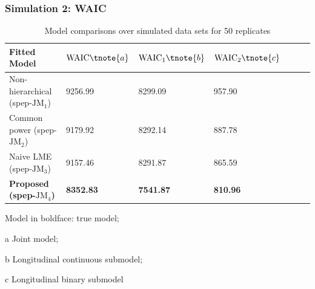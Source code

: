 \documentclass[fleqn]{beamer}
\begin{document}
\begin{frame}
\frametitle{Simulation 2: WAIC}

\begin{table}[ht]
\caption{\footnotesize Model comparisons over simulated data sets for 50 replicates} \label{tab:chp2_sim}
\footnotesize
 \begin{threeparttable}
\begin{tabular}{lllllll}
    \toprule
  Fitted Model &
 $\mbox{WAIC} \tnote{a}$ & $\mbox{WAIC}_1 \tnote{b}$ & $\mbox{WAIC}_2 \tnote{c}$ \\
 \midrule 
   Non-hierarchical (spep-$\mbox{JM}_1$) & 
                9256.99 & 8299.09 & 957.90 \\
  
   Common power (spep-$\mbox{JM}_2$) &
                9179.92 &  8292.14 &  887.78 \\
  
   Naive LME (spep-$\mbox{JM}_3$) &
                 9157.46 & 8291.87 &  865.59 \\
   
   \textbf{Proposed (spep-$\mbox{JM}_4$)} & \textbf{8352.83} & \textbf{7541.87} & \textbf{810.96} \\
    \bottomrule
  \end{tabular}
  \begin{tablenotes}[para]
  \tiny
  Model in boldface: true model; \item[a] Joint model; \item[b] Longitudinal continuous submodel; \item[c] Longitudinal binary submodel
    \end{tablenotes}
\end{threeparttable}
\end{table}
\end{frame}
\end{document}
